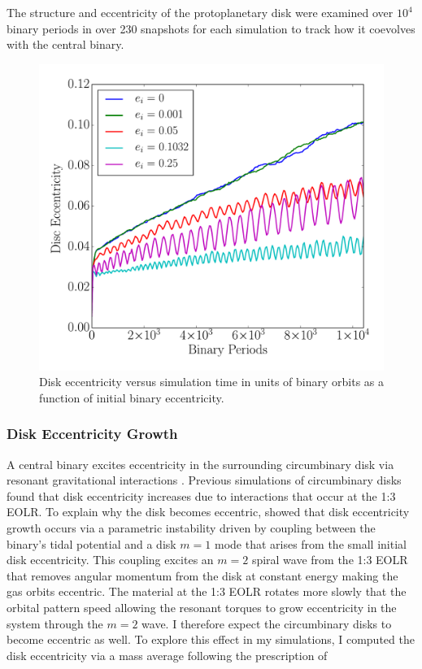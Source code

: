 The structure and eccentricity of the protoplanetary disk were examined over $10^4$ binary periods in over 230 snapshots
for each simulation to track how it coevolves with the central binary.

\begin{figure}
	\includegraphics[width=\columnwidth]{f2}
    \caption{Disk eccentricity versus simulation time in units of binary orbits as a function of initial binary eccentricity.}
    \label{fig:CBDiskDiskEcc}
\end{figure}


\subsubsection{Disk Eccentricity Growth} \label{CBDisk:sec:discEccEvolution}

A central binary excites eccentricity in the surrounding
circumbinary disk via resonant gravitational interactions
\citep{Papaloizou2001,Artymowicz1996a}.  Previous simulations of circumbinary
disks \citep{Kley2008,Papaloizou2001,Pierens2007,Pierens2013} found
that disk eccentricity increases due to interactions that occur at
the 1:3 EOLR.  To explain why the disk becomes eccentric, \citet{Papaloizou2001} showed that disk eccentricity growth occurs via a parametric instability driven by coupling between the binary's tidal potential and a disk $m = 1$ mode that arises from the small initial disk eccentricity.  This coupling excites an $m = 2$ spiral wave from the 1:3 EOLR that removes angular momentum from the disk at constant energy making the gas orbits eccentric.  The material at the 1:3 EOLR rotates more slowly that the orbital pattern speed allowing the resonant torques to grow eccentricity in the system through the $m = 2$ wave.  I therefore expect the circumbinary disks to become eccentric as well.  To explore this effect in my simulations, I computed the disk eccentricity via a mass average following the prescription of \citet{Pierens2007}

